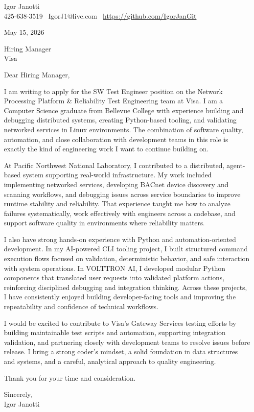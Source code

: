 \documentclass[11pt]{article}
\begin{document}
Igor Janotti\\
425-638-3519 \textbar\ IgorJ1@live.com \textbar\ \url{https://github.com/IgorJanGit}

May 15, 2026

Hiring Manager\\
Visa

Dear Hiring Manager,

I am writing to apply for the SW Test Engineer position on the Network Processing Platform \& Reliability Test Engineering team at Visa. I am a Computer Science graduate from Bellevue College with experience building and debugging distributed systems, creating Python-based tooling, and validating networked services in Linux environments. The combination of software quality, automation, and close collaboration with development teams in this role is exactly the kind of engineering work I want to continue building on.

At Pacific Northwest National Laboratory, I contributed to a distributed, agent-based system supporting real-world infrastructure. My work included implementing networked services, developing BACnet device discovery and scanning workflows, and debugging issues across service boundaries to improve runtime stability and reliability. That experience taught me how to analyze failures systematically, work effectively with engineers across a codebase, and support software quality in environments where reliability matters.

I also have strong hands-on experience with Python and automation-oriented development. In my AI-powered CLI tooling project, I built structured command execution flows focused on validation, deterministic behavior, and safe interaction with system operations. In VOLTTRON AI, I developed modular Python components that translated user requests into validated platform actions, reinforcing disciplined debugging and integration thinking. Across these projects, I have consistently enjoyed building developer-facing tools and improving the repeatability and confidence of technical workflows.

I would be excited to contribute to Visa's Gateway Services testing efforts by building maintainable test scripts and automation, supporting integration validation, and partnering closely with development teams to resolve issues before release. I bring a strong coder's mindset, a solid foundation in data structures and systems, and a careful, analytical approach to quality engineering.

Thank you for your time and consideration.

Sincerely,\\
Igor Janotti
\end{document}
